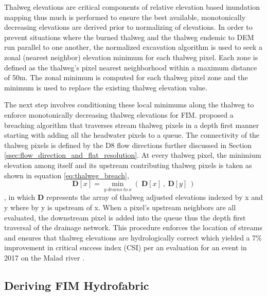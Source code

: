 Thalweg elevations are critical components of relative elevation based inundation mapping thus much is performed to ensure the best available, monotonically decreasing elevations are derived prior to normalizing of elevations.
In order to prevent situations where the burned thalweg and the thalweg endemic to DEM run parallel to one another, the normalized excavation algorithm \cite{saunders1999preparation} is used to seek a zonal (nearest neighbor) elevation minimum for each thalweg pixel. 
Each zone is defined as the thalweg's pixel nearest neighborhood within a maximum distance of 50m.
The zonal minimum is computed for each thalweg pixel zone and the minimum is used to replace the existing thalweg elevation value.

The next step involves conditioning these local minimums along the thalweg to enforce monotonically decreasing thalweg elevations for FIM.
 proposed a breaching algorithm that traverses stream thalweg pixels in a depth first manner  starting with adding all the headwater pixels to a queue. 
The connectivity of the thalweg pixels is defined by the D8 flow directions further discussed in Section \ref{ssec:flow_direction_and_flat_resolution}.
At every thalweg pixel, the minimium elevation among itself and its upstream contributing thalweg pixels is taken as shown in equation \ref{eq:thalweg_breach},
%
\begin{equation}
\label{eq:thalweg_breach}
\textbf{D}[x] = \min_{y\ drains\ to\ x} {(\ \textbf{D}[x]\ ,\ \textbf{D}[y]\ )}
\end{equation}
%
, in which \textbf{D} represents the array of thalweg adjusted elevations indexed by x and y where by y is upstream of x. 
When a pixel's upstream neighbors are all evaluated, the downstream pixel is added into the queue thus the depth first traversal of the drainage network.
This procedure enforces the location of streams and ensures that thalweg elevations are hydrologically correct which yielded a 7\% improvement in critical success index (CSI) per an evaluation for an event in 2017 on the Malad river \cite{garousi2019terrain}.

\subsection{Deriving FIM Hydrofabric}

